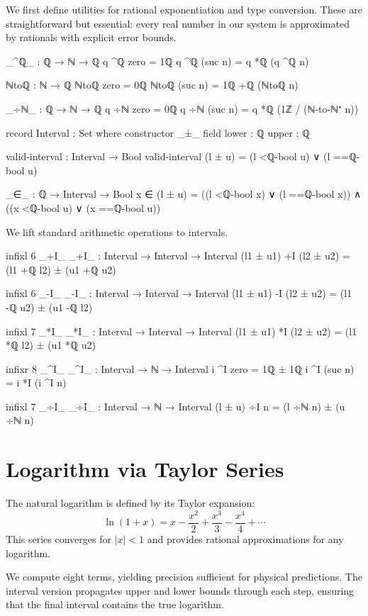 \documentclass[11pt,a4paper]{book}
\begin{document}
We first define utilities for rational exponentiation and type conversion.
These are straightforward but essential: every real number in our system is approximated by rationals with explicit error bounds.

\begin{code}
_^ℚ_ : ℚ → ℕ → ℚ
q ^ℚ zero = 1ℚ
q ^ℚ (suc n) = q *ℚ (q ^ℚ n)

ℕtoℚ : ℕ → ℚ
ℕtoℚ zero = 0ℚ
ℕtoℚ (suc n) = 1ℚ +ℚ (ℕtoℚ n)

_÷ℕ_ : ℚ → ℕ → ℚ
q ÷ℕ zero = 0ℚ
q ÷ℕ (suc n) = q *ℚ (1ℤ / (ℕ-to-ℕ⁺ n))
\end{code}

\begin{code}
record Interval : Set where
  constructor _±_
  field
    lower : ℚ
    upper : ℚ

valid-interval : Interval → Bool
valid-interval (l ± u) = (l <ℚ-bool u) ∨ (l ==ℚ-bool u)

_∈_ : ℚ → Interval → Bool
x ∈ (l ± u) = ((l <ℚ-bool x) ∨ (l ==ℚ-bool x)) ∧ ((x <ℚ-bool u) ∨ (x ==ℚ-bool u))
\end{code}

We lift standard arithmetic operations to intervals.

\begin{code}
infixl 6 _+I_
_+I_ : Interval → Interval → Interval
(l1 ± u1) +I (l2 ± u2) = (l1 +ℚ l2) ± (u1 +ℚ u2)

infixl 6 _-I_
_-I_ : Interval → Interval → Interval
(l1 ± u1) -I (l2 ± u2) = (l1 -ℚ u2) ± (u1 -ℚ l2)

infixl 7 _*I_
_*I_ : Interval → Interval → Interval
(l1 ± u1) *I (l2 ± u2) = 
  (l1 *ℚ l2) ± (u1 *ℚ u2)

infixr 8 _^I_
_^I_ : Interval → ℕ → Interval
i ^I zero = 1ℚ ± 1ℚ
i ^I (suc n) = i *I (i ^I n)

infixl 7 _÷I_
_÷I_ : Interval → ℕ → Interval
(l ± u) ÷I n = (l ÷ℕ n) ± (u ÷ℕ n)
\end{code}

\section{Logarithm via Taylor Series}

The natural logarithm is defined by its Taylor expansion:
\[
\ln(1+x) = x - \frac{x^2}{2} + \frac{x^3}{3} - \frac{x^4}{4} + \cdots
\]
This series converges for $|x| < 1$ and provides rational approximations for any logarithm.

We compute eight terms, yielding precision sufficient for physical predictions. The interval version propagates upper and lower bounds through each step, ensuring that the final interval contains the true logarithm.
\end{document}
